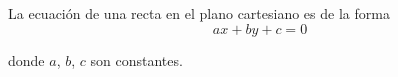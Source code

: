 La ecuación de una recta en el plano cartesiano es de la forma
$$ax+by+c=0$$\usepackage{fancyvrb}

donde $a$, $b$, $c$ son constantes.